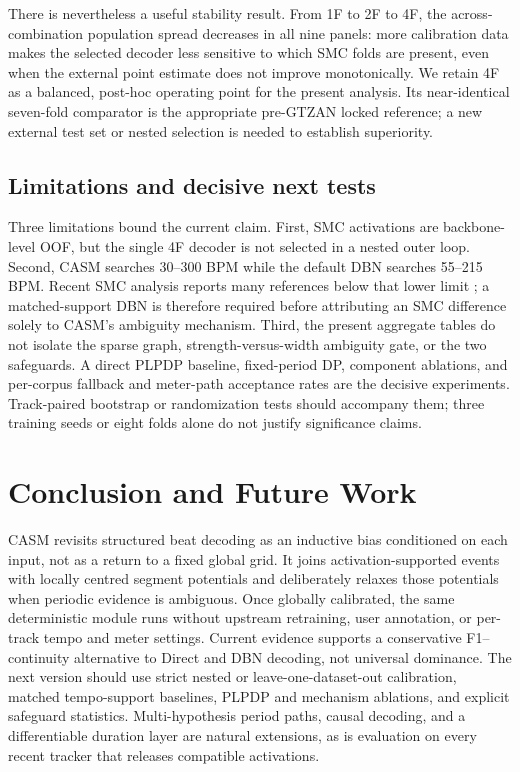 \documentclass{article}
\begin{document}
There is nevertheless a useful stability result. From 1F to 2F to 4F, the
across-combination population spread decreases in all nine panels: more
calibration data makes the selected decoder less sensitive to which SMC folds
are present, even when the external point estimate does not improve
monotonically. We retain 4F as a balanced, post-hoc operating point for the
present analysis. Its near-identical seven-fold comparator is the appropriate
pre-GTZAN locked reference; a new external test set or nested selection is
needed to establish superiority.

\subsection{Limitations and decisive next tests}

Three limitations bound the current claim. First, SMC activations are
backbone-level OOF, but the single 4F decoder is not selected in a nested outer
loop. Second, CASM searches 30--300 BPM while the default DBN searches
55--215 BPM. Recent SMC analysis reports many references below that lower
limit \cite{ahn2026smcblindspot}; a matched-support DBN is therefore required
before attributing an SMC difference solely to CASM's ambiguity mechanism.
Third, the present aggregate tables do not isolate the sparse graph,
strength-versus-width ambiguity gate, or the two safeguards. A direct PLPDP
baseline, fixed-period DP, component ablations, and per-corpus fallback and
meter-path acceptance rates are the decisive experiments. Track-paired
bootstrap or randomization tests should accompany them; three training seeds
or eight folds alone do not justify significance claims.

\section{Conclusion and Future Work}
\label{sec:concl}

CASM revisits structured beat decoding as an inductive bias conditioned on each
input, not as a return to a fixed global grid. It joins activation-supported events
with locally centred segment potentials and deliberately relaxes those
potentials when periodic evidence is ambiguous. Once globally calibrated,
the same deterministic module runs without upstream retraining, user
annotation, or per-track tempo and meter settings. Current evidence supports
a conservative F1--continuity alternative to Direct and DBN decoding, not
universal dominance. The next version should use strict nested or
leave-one-dataset-out calibration, matched tempo-support baselines, PLPDP and
mechanism ablations, and explicit safeguard statistics. Multi-hypothesis
period paths, causal decoding, and a differentiable duration layer are natural
extensions, as is evaluation on every recent tracker that releases compatible
activations.



\end{document}
